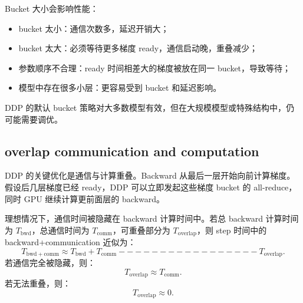 Bucket 大小会影响性能：

\begin{itemize}
\item bucket 太小：通信次数多，延迟开销大；
\item bucket 太大：必须等待更多梯度 ready，通信启动晚，重叠减少；
\item 参数顺序不合理：ready 时间相差大的梯度被放在同一 bucket，导致等待；
\item 模型中存在很多小层：更容易受到 bucket 和延迟影响。
\end{itemize}

DDP 的默认 bucket 策略对大多数模型有效，但在大规模模型或特殊结构中，仍可能需要调优。

\subsection{overlap communication and computation}
\label{subsec:overlap-communication-computation}

DDP 的关键优化是通信与计算重叠。Backward 从最后一层开始向前计算梯度。假设后几层梯度已经 ready，DDP 可以立即发起这些梯度 bucket 的 all-reduce，同时 GPU 继续计算更前面层的 backward。

理想情况下，通信时间被隐藏在 backward 计算时间中。若总 backward 计算时间为 $T_{\mathrm{bwd}}$，总通信时间为 $T_{\mathrm{comm}}$，可重叠部分为 $T_{\mathrm{overlap}}$，则 step 时间中的 backward+communication 近似为：
\[
T_{\mathrm{bwd+comm}}
\approx
T_{\mathrm{bwd}}
+
T_{\mathrm{comm}}
-----------------
T_{\mathrm{overlap}}.
\]
若通信完全被隐藏，则：
\[
T_{\mathrm{overlap}}\approx T_{\mathrm{comm}}.
\]
若无法重叠，则：
\[
T_{\mathrm{overlap}}\approx 0.
\]

